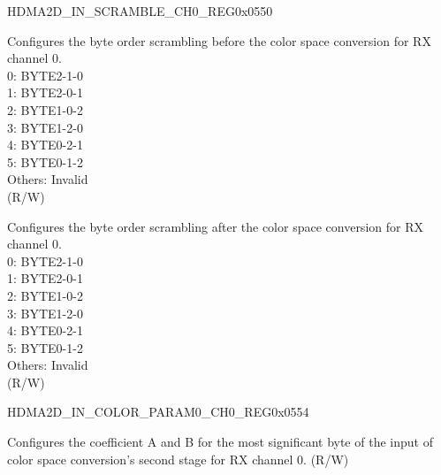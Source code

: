 \begin{register}{H}{DMA2D\_IN\_SCRAMBLE\_CH0\_REG}{0x0550}\label{regdesc:DMA2DINSCRAMBLECH0REG}
%
%
%
\regnewline%
\begin{regdesc}\begin{reglist}
\label{fielddesc:DMA2DINSCRAMBLESELPRECH0}\item [DMA2D\_IN\_SCRAMBLE\_SEL\_PRE\_CH0] Configures the byte order scrambling before the color space conversion for RX channel 0.\\
0: BYTE2-1-0\\
1: BYTE2-0-1\\
2: BYTE1-0-2\\
3: BYTE1-2-0\\
4: BYTE0-2-1\\
5: BYTE0-1-2\\
Others: Invalid\\ (R/W)
\label{fielddesc:DMA2DINSCRAMBLESELPOSTCH0}\item [DMA2D\_IN\_SCRAMBLE\_SEL\_POST\_CH0] Configures the byte order scrambling after the color space conversion for RX channel 0.\\
0: BYTE2-1-0\\
1: BYTE2-0-1\\
2: BYTE1-0-2\\
3: BYTE1-2-0\\
4: BYTE0-2-1\\
5: BYTE0-1-2\\
Others: Invalid\\ (R/W)
\end{reglist}\end{regdesc}
\end{register}


\begin{register}{H}{DMA2D\_IN\_COLOR\_PARAM0\_CH0\_REG}{0x0554}\label{regdesc:DMA2DINCOLORPARAM0CH0REG}
%
%
\regnewline%
\begin{regdesc}\begin{reglist}
\label{fielddesc:DMA2DINCOLORPARAMH0CH0}\item [DMA2D\_IN\_COLOR\_PARAM\_H0\_CH0] Configures the coefficient A and B for the most significant byte of the input of color space conversion's second stage for RX channel 0. (R/W)
\end{reglist}\end{regdesc}
\end{register}


